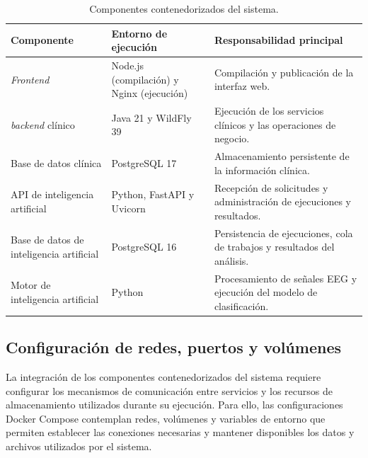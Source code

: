 \begin{table}[htbp]
    \centering
    \caption{Componentes contenedorizados del sistema.}
    \label{tab:componentes-contenedorizados}
    \small
    \begin{tabularx}{\textwidth}{|
        >{\raggedright\arraybackslash}p{}|
        >{\raggedright\arraybackslash}p{}|
        >{\raggedright\arraybackslash}X|}
        \hline
        \textbf{Componente} &
        \textbf{Entorno de ejecución} &
        \textbf{Responsabilidad principal} \\
        \hline

        \textit{Frontend} &
        Node.js (compilación) y Nginx (ejecución) &
        Compilación y publicación de la interfaz web. \\
        \hline

        \textit{backend} clínico &
        Java 21 y WildFly 39 &
        Ejecución de los servicios clínicos y las operaciones de negocio. \\
        \hline

        Base de datos clínica &
        PostgreSQL 17 &
        Almacenamiento persistente de la información clínica. \\
        \hline

        API de inteligencia artificial &
        Python, FastAPI y Uvicorn &
        Recepción de solicitudes y administración de ejecuciones y resultados. \\
        \hline

        Base de datos de inteligencia artificial &
        PostgreSQL 16 &
        Persistencia de ejecuciones, cola de trabajos y resultados del análisis. \\
        \hline

        Motor de inteligencia artificial &
        Python &
        Procesamiento de señales EEG y ejecución del modelo de clasificación. \\
        \hline
    \end{tabularx}
\end{table}


\subsection{Configuración de redes, puertos y volúmenes}

La integración de los componentes contenedorizados del sistema
requiere configurar los mecanismos de comunicación entre
servicios y los recursos de almacenamiento utilizados durante
su ejecución. Para ello, las configuraciones Docker Compose
contemplan redes, volúmenes y variables de entorno que permiten
establecer las conexiones necesarias y mantener disponibles
los datos y archivos utilizados por el sistema.

